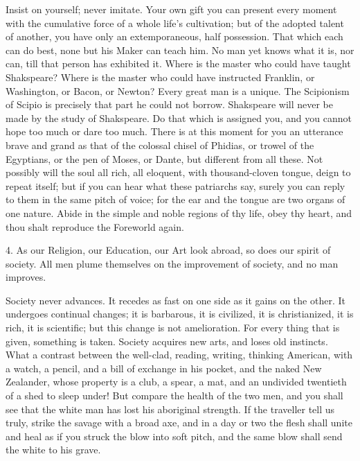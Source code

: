 \documentclass{article}
\begin{document}
Insist on yourself; never imitate. Your own gift you can present every
moment with the cumulative force of a whole life's cultivation; but of the
adopted talent of another, you have only an extemporaneous, half possession.
That which each can do best, none but his Maker can teach him. No man yet
knows what it is, nor can, till that person has exhibited it. Where is the
master who could have taught Shakspeare? Where is the master who could have
instructed Franklin, or Washington, or Bacon, or Newton? Every great man is
a unique. The Scipionism of Scipio is precisely that part he could not
borrow. Shakspeare will never be made by the study of Shakspeare. Do that
which is assigned you, and you cannot hope too much or dare too much. There
is at this moment for you an utterance brave and grand as that of the
colossal chisel of Phidias, or trowel of the Egyptians, or the pen of Moses,
or Dante, but different from all these. Not possibly will the soul all rich,
all eloquent, with thousand-cloven tongue, deign to repeat itself; but if
you can hear what these patriarchs say, surely you can reply to them in the
same pitch of voice; for the ear and the tongue are two organs of one
nature. Abide in the simple and noble regions of thy life, obey thy heart,
and thou shalt reproduce the Foreworld again.

4. As our Religion, our Education, our Art look abroad, so does our spirit
of society. All men plume themselves on the improvement of society, and no
man improves.

Society never advances. It recedes as fast on one side as it gains on the
other. It undergoes continual changes; it is barbarous, it is civilized, it
is christianized, it is rich, it is scientific; but this change is not
amelioration. For every thing that is given, something is taken. Society
acquires new arts, and loses old instincts. What a contrast between the
well-clad, reading, writing, thinking American, with a watch, a pencil, and
a bill of exchange in his pocket, and the naked New Zealander, whose
property is a club, a spear, a mat, and an undivided twentieth of a shed to
sleep under! But compare the health of the two men, and you shall see that
the white man has lost his aboriginal strength. If the traveller tell us
truly, strike the savage with a broad axe, and in a day or two the flesh
shall unite and heal as if you struck the blow into soft pitch, and the same
blow shall send the white to his grave.
\end{document}
